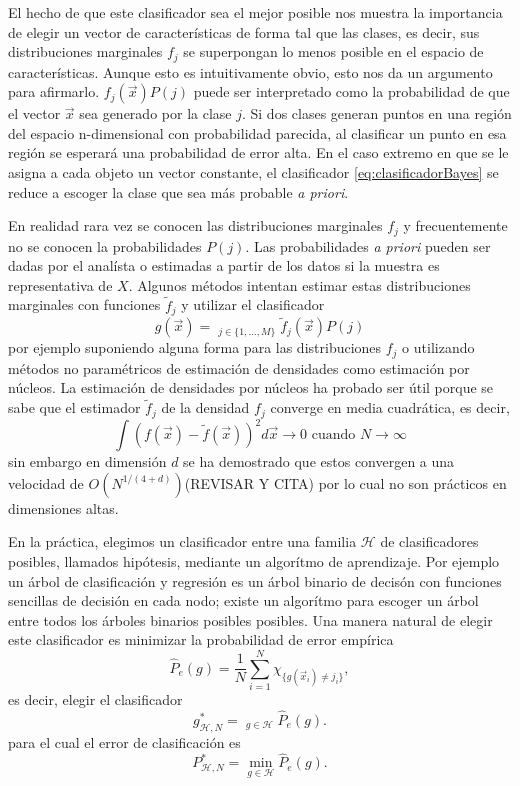 \documentclass[letterpaper,12pt]{book}
\DeclareMathOperator*{\argmax}{arg\,m\acute{a}x}
\DeclareMathOperator*{\argmin}{arg\,m\acute{i}n}
\begin{document}
El hecho de que este clasificador sea el mejor posible nos muestra la importancia de elegir un vector de características de forma tal que las clases, es decir, sus distribuciones marginales $f_j$ se superpongan lo menos posible en el espacio de características. Aunque esto es intuitivamente obvio, esto nos da un argumento para afirmarlo. $f_j(\vec{x})P(j)$ puede ser interpretado como la probabilidad de que el vector $\vec{x}$ sea generado por la clase $j$. Si dos clases generan puntos en una región del espacio n-dimensional con probabilidad parecida, al clasificar un punto en esa región se esperará una probabilidad de error alta. En el caso extremo en que se le asigna a cada objeto un vector constante, el clasificador \ref{eq:clasificadorBayes} se reduce a escoger la clase que sea más probable \textit{a priori}.

En realidad rara vez se conocen las distribuciones marginales $f_j$ y frecuentemente no se conocen la probabilidades $P(j)$. Las probabilidades \textit{a priori} pueden ser dadas por el analísta o estimadas a partir de los datos si la muestra es representativa de $X$. Algunos métodos intentan estimar estas distribuciones marginales con funciones $\tilde{f}_j$ y utilizar el clasificador 
\begin{equation}
  g(\vec{x}) = \argmax_{j\in\{1,\dots,M\}}\tilde{f}_j(\vec{x})P(j)
\end{equation}
por ejemplo suponiendo alguna forma para las distribuciones $f_j$ o utilizando métodos no paramétricos de estimación de densidades como estimación por núcleos. La estimación de densidades por núcleos ha probado ser útil porque se sabe que el estimador $\tilde{f}_{j}$ de la densidad $f_j$ converge en media cuadrática, es decir,
\begin{equation}
  \int\left(f(\vec{x})-\tilde{f}(\vec{x})\right)^2d\vec{x}\rightarrow 0\text{ cuando } N\to\infty
\end{equation}
 sin embargo en dimensión $d$ se ha demostrado que estos convergen a una velocidad de $O(N^{1/(4+d)})$(REVISAR Y CITA) por lo cual no son prácticos en dimensiones altas. 

En la práctica, elegimos un clasificador entre una familia $\mathcal{H}$ de clasificadores posibles, llamados hipótesis, mediante un algorítmo de aprendizaje. Por ejemplo un árbol de clasificación y regresión es un árbol binario de decisón con funciones sencillas de decisión en cada nodo; existe un algorítmo para  escoger un árbol entre todos los árboles binarios posibles posibles. Una manera natural de elegir este clasificador es minimizar la probabilidad de error empírica
\begin{equation}
\hat{P}_{e}(g) = \frac{1}{N}\sum_{i=1}^{N}\chi_{\{g(\vec{x}_i)\neq j_{i}\}},
\end{equation}
es decir, elegir el clasificador
\begin{equation}\label{eq:empiricalErrorMin}
  g_{\mathcal{H}, N}^{*} = \argmin_{g\in\mathcal{H}} \hat{P}_{e}(g).
\end{equation} 
para el cual el error de clasificación es
\begin{equation}
  P_{\mathcal{H}, N}^{*} = \min_{g\in\mathcal{H}} \hat{P}_{e}(g).
\end{equation}
\end{document}
